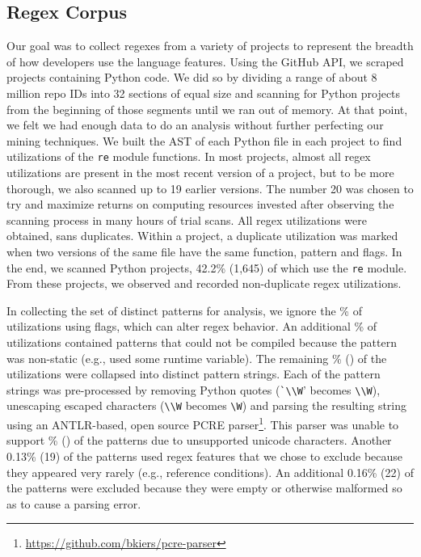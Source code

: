 \subsection{Regex Corpus}
\label{study:corpus}
Our goal was to collect regexes from a variety of projects to represent the breadth of how developers use the language features.
Using the GitHub API, we scraped   projects containing Python code.
We did so  by dividing a range of about 8 million repo IDs
into 32 sections of equal size and scanning  for Python projects from the beginning of those
segments until we ran out of memory. At that point, we felt we had enough data
to do an analysis without further perfecting our mining techniques. We built
the AST of each Python file in each project to find utilizations of the {\tt re} module
functions. In most projects, almost all regex utilizations are present in the
most recent version of a project, but to be more thorough, we also scanned up
to 19 earlier versions. The number 20 was chosen to try and maximize returns on computing resources invested after observing the scanning process in many hours of trial scans.
All regex utilizations were obtained, sans duplicates. Within a project, a duplicate utilization was marked when two versions of the same file have the same function, pattern and flags.  In the end, we scanned  Python projects, 42.2\% (1,645) of which use the {\tt re} module.  From these projects, we observed and recorded  non-duplicate regex utilizations.

In collecting the set of distinct patterns for analysis,  we ignore the \%  of utilizations using flags, which can alter regex behavior.  An additional \% of utilizations contained patterns that could not be compiled because the pattern was non-static (e.g., used some runtime variable).
The remaining \% () of the utilizations were collapsed into  distinct pattern strings.  Each of the pattern strings was pre-processed by removing Python quotes (\verb!`\\W!' becomes \verb!\\W!), unescaping escaped characters (\verb!\\W! becomes \verb!\W!) and parsing the resulting  string using an ANTLR-based, open source PCRE parser\footnote{\url{https://github.com/bkiers/pcre-parser}}.
This parser was unable to support \% () of the patterns due to unsupported unicode characters.  Another 0.13\% (19) of the patterns used regex features that we  chose to exclude because they appeared very rarely (e.g., reference conditions).  An additional 0.16\% (22) of the patterns were excluded because they were empty or otherwise malformed so as to cause a parsing error.

